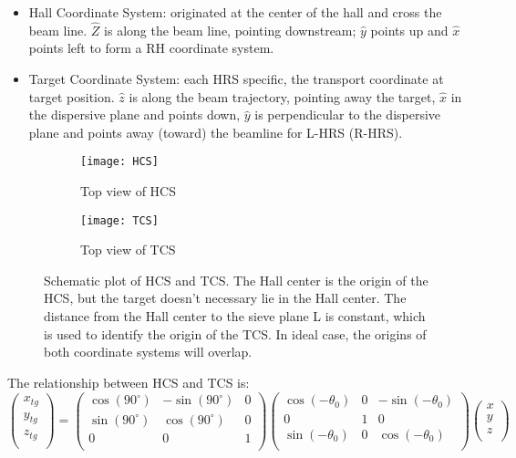 \begin{itemize}
    \item Hall Coordinate System: originated at the center of the hall and
	cross the beam line.  $\hat{Z}$ is along the beam line, pointing downstream; 
	$\hat{y}$ points up and $\hat{x}$ points left to form a RH coordinate system.
    \item Target Coordinate System: each HRS specific, the transport coordinate at target position.
	$\hat{z}$ is along the beam trajectory, pointing away the target, 
	$\hat{x}$ in the dispersive plane and points down, $\hat{y}$ is perpendicular
	to the dispersive plane and points away (toward) the beamline for L-HRS (R-HRS).
\end{itemize}

\begin{figure}[H]
    \begin{subfigure}[b]{0.5\textwidth}
	\texttt{[image: HCS]}
	\caption{Top view of HCS}
    \end{subfigure}
    \begin{subfigure}[b]{0.5\textwidth}
	\texttt{[image: TCS]}
	\caption{Top view of TCS}
    \end{subfigure}
    \caption{Schematic plot of HCS and TCS. The Hall center is the origin of the 
    HCS, but the target doesn't necessary lie in the Hall center. The distance
    from the Hall center to the sieve plane L is constant, which is used to
    identify the origin of the TCS. In ideal case, the origins of both coordinate
    systems will overlap.}
\end{figure}

The relationship between HCS and TCS is:
\begin{equation}
    \begin{pmatrix}
	x_{tg}	\\
	y_{tg}	\\
	z_{tg}	\\
    \end{pmatrix}
    =
    \begin{pmatrix}
	\cos(90^\circ)   & -\sin(90^\circ)    & 0	\\
	\sin(90^\circ)   & \cos(90^\circ)     & 0	\\
	0   & 0     & 1	\\
    \end{pmatrix}
    \begin{pmatrix}
	\cos(-\theta_0)	& 0 & -\sin(-\theta_0)  \\
	0		& 1 & 0		\\
	\sin(-\theta_0)	& 0 & \cos(-\theta_0)  \\
    \end{pmatrix}
    \begin{pmatrix}
	x   \\
	y   \\
	z   \\
    \end{pmatrix}
\end{equation}

